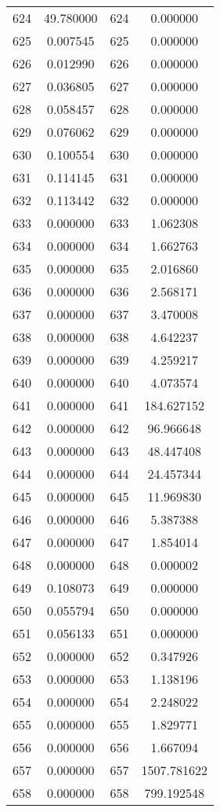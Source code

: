\documentclass[12pt]{article}
\begin{document}
\begin{longtable}{@{}cccc@{}}
624 & 49.780000 & 624 & 0.000000 \\
625 & 0.007545 & 625 & 0.000000 \\
626 & 0.012990 & 626 & 0.000000 \\
627 & 0.036805 & 627 & 0.000000 \\
628 & 0.058457 & 628 & 0.000000 \\
629 & 0.076062 & 629 & 0.000000 \\
630 & 0.100554 & 630 & 0.000000 \\
631 & 0.114145 & 631 & 0.000000 \\
632 & 0.113442 & 632 & 0.000000 \\
633 & 0.000000 & 633 & 1.062308 \\
634 & 0.000000 & 634 & 1.662763 \\
635 & 0.000000 & 635 & 2.016860 \\
636 & 0.000000 & 636 & 2.568171 \\
637 & 0.000000 & 637 & 3.470008 \\
638 & 0.000000 & 638 & 4.642237 \\
639 & 0.000000 & 639 & 4.259217 \\
640 & 0.000000 & 640 & 4.073574 \\
641 & 0.000000 & 641 & 184.627152 \\
642 & 0.000000 & 642 & 96.966648 \\
643 & 0.000000 & 643 & 48.447408 \\
644 & 0.000000 & 644 & 24.457344 \\
645 & 0.000000 & 645 & 11.969830 \\
646 & 0.000000 & 646 & 5.387388 \\
647 & 0.000000 & 647 & 1.854014 \\
648 & 0.000000 & 648 & 0.000002 \\
649 & 0.108073 & 649 & 0.000000 \\
650 & 0.055794 & 650 & 0.000000 \\
651 & 0.056133 & 651 & 0.000000 \\
652 & 0.000000 & 652 & 0.347926 \\
653 & 0.000000 & 653 & 1.138196 \\
654 & 0.000000 & 654 & 2.248022 \\
655 & 0.000000 & 655 & 1.829771 \\
656 & 0.000000 & 656 & 1.667094 \\
657 & 0.000000 & 657 & 1507.781622 \\
658 & 0.000000 & 658 & 799.192548 \\

\end{longtable}
\end{document}
